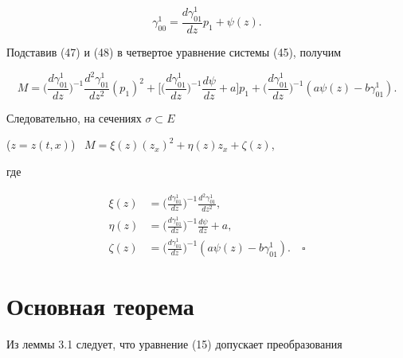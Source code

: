 \begin{equation}


\gamma_{00}^1=\frac{{d\gamma_{01}^1}}{{dz}} p_1+\psi (z).


\end{equation}


Подставив (47) и (48) в четвертое уравнение системы (45), получим 


$$


M=\bigg({\frac{{d\gamma_{01}^1}}{{dz}}}\bigg)^{-1} 


\frac{{d^2 \gamma_{01}^1}}{{dz^2}} ({p_1})^2+


\bigg[ { \bigg({\frac{{d\gamma_{01}^1}}{{dz}}}\bigg)^{-1} 


\frac{{d\psi}}{{dz}}+a} \bigg] p_1 +


\bigg({\frac{{d\gamma_{01}^1}}{{dz}}}\bigg)^{-1} 


({a \psi (z)-b\gamma_{01}^1}).


$$


Следовательно, на сечениях $\sigma \subset E$


(${z=z ({t,x})}$) \ $M=\xi(z)({z_x})^2+\eta(z) z_x+\zeta (z)$,


где


\begin{align*}


\xi (z)&= \bigg({\frac{{d\gamma_{01}^1}}{{dz}}}\bigg)^{-1} 


\frac{{d^2 \gamma_{01}^1}}{{dz^2}}, \\


\eta (z)&= \bigg({\frac{{d\gamma_{01}^1}}{{dz}}}\bigg)^{-1} 


\frac{{d\psi}}{{dz}}+a, \\


\zeta (z)&= \bigg({\frac{{d\gamma_{01}^1}}{{dz}}}\bigg)^{-1} 


({a \psi (z)-b\gamma_{01}^1}). 


\quad\square


\end{align*}








\section{Основная теорема}





Из леммы 3.1 следует, что уравнение (15) допускает преобразования 


